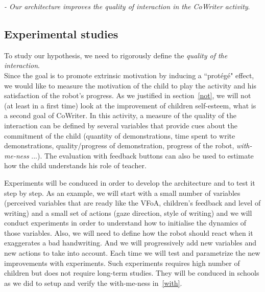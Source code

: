 \documentclass[10pt,a4paper]{article}
\begin{document}
\textit{- Our architecture improves the quality of interaction in the CoWriter activity}.\\

\subsection{Experimental studies}

To study our hypothesis, we need to rigorously define the \textit{quality of the interaction}.\\
Since the goal is to promote extrinsic motivation by inducing a ``prot\'eg\'e" effect, we would like to measure the motivation of the child to play the activity and his satisfaction of the robot's progress. As we justified in section~\ref{not}, we will not (at least in a first time) look at the improvement of children self-esteem, what is a second goal of CoWriter. In this activity, a measure of the quality of the interaction can be defined by several variables that provide cues about the commitment of the child (quantity of demonstrations, time spent to write demonstrations, quality/progress of demonstration, progress of the robot, \textit{with-me-ness} ...). The evaluation with feedback buttons can also be used to estimate how the child understands his role of teacher.


Experiments will be conduced in order to develop the architecture and to test it step by step. 
As an example, we will start with a small number of variables (perceived variables that are ready like the VFoA, children's feedback and level of writing) and a small set of actions (gaze direction, style of writing) and we will conduct experiments in order to understand how to initialise the dynamics of those variables. 
Also, we will need to define how the robot should react when it exaggerates a bad handwriting. And we will progressively add new variables  and new actions to take into account. 
Each time we will test and parametrize the new improvements with experiments. Such experiments requires high number of children but does not require long-term studies. They will be conduced in schools as we did to setup and verify the with-me-ness in~\ref{with}.
\end{document}
